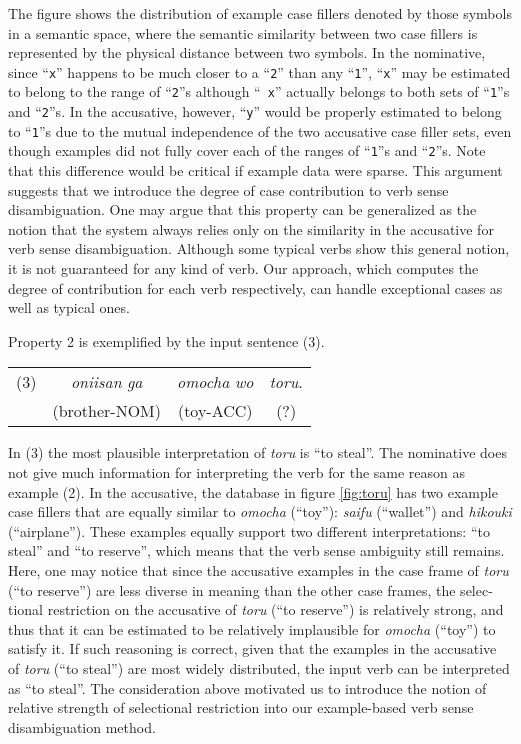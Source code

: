 \vspace{-2mm}
The figure shows the distribution of example case fillers denoted by
those symbols in a semantic space, where the semantic similarity
between two case fillers is represented by the physical distance
between two symbols.  In the nominative, since ``{\tt x}'' happens to
be much closer to a ``{\tt 2}'' than any ``{\tt 1}'', ``{\tt x}'' may
be estimated to belong to the range of ``{\tt 2}''s although ``{\tt
  x}'' actually belongs to both sets of ``{\tt 1}''s and ``{\tt 2}''s.
In the accusative, however, ``{\tt y}'' would be properly estimated to
belong to ``{\tt 1}''s due to the mutual independence of the two
accusative case filler sets, even though examples did not fully cover
each of the ranges of ``{\tt 1}''s and ``{\tt 2}''s. Note that this
difference would be critical if example data were sparse.  This
argument suggests that we introduce the degree of case contribution to
verb sense disambiguation.  One may argue that this property can be
generalized as the notion that the system always relies only on the
similarity in the accusative for verb sense disambiguation. Although
some typical verbs show this general notion, it is not guaranteed for
any kind of verb. Our approach, which computes the degree of
contribution for each verb respectively, can handle exceptional cases
as well as typical ones.

Property 2 is exemplified by the input sentence (3).
\begin{list}{}{\setlength{\leftmargin}{0mm}}
\item
  \begin{tabular}{cccc}
    (3) & {\it oniisan\/} {\it ga\/} & {\it omocha\/} {\it wo\/} &
    {\it toru}. \\ & (brother-NOM) & (toy-ACC) & (?)
  \end{tabular}
\end{list}
In (3) the most plausible interpretation of {\it toru\/} is ``to
steal''.  The nominative does not give much information for
interpreting the verb for the same reason as example (2). In the
accusative, the database in figure \ref{fig:toru} has two example case
fillers that are equally similar to {\it omocha\/} (``toy''): {\it
  saifu\/} (``wallet'') and {\it hikouki\/} (``airplane''). These
examples equally support two different interpretations: ``to steal''
and ``to reserve'', which means that the verb sense ambiguity still
remains.  Here, one may notice that since the accusative examples in
the case frame of {\it toru\/} (``to reserve'') are less diverse in
meaning than the other case frames, the selec- tional restriction on the
accusative of {\it toru\/} (``to reserve'') is relatively strong, and
thus that it can be estimated to be relatively implausible for {\it
  omocha\/} (``toy'') to satisfy it.  If such reasoning is correct,
given that the examples in the accusative of {\it toru\/} (``to
steal'') are most widely distributed, the input verb can be
interpreted as ``to steal''.  The consideration above motivated us to
introduce the notion of relative strength of selectional restriction
into our example-based verb sense disambiguation method.

